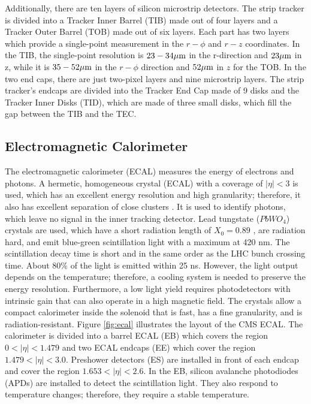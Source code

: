 Additionally, there are ten layers of silicon microstrip detectors. The strip tracker is divided into a Tracker Inner Barrel (TIB) made out of four layers and a Tracker Outer Barrel (TOB) made out of six layers. Each part has two layers which provide a single-point measurement in the $r - \phi$ and $r - z$ coordinates. In the TIB, the single-point resolution is $23 - 34 \mu \text{m}$ in the r-direction and $23 \mu \text{m}$ in z, while it is $35 - 52 \mu \text{m}$ in the $r-\phi$ direction and $52 \mu \text{m}$ in $z$ for the TOB. In the two end caps, there are just two-pixel layers and nine microstrip layers. The strip tracker's endcaps are divided into the Tracker End Cap made of 9 disks and the Tracker Inner Disks (TID), which are made of three small disks, which fill the gap between the TIB and the TEC.

\subsection{Electromagnetic Calorimeter}

The electromagnetic calorimeter (ECAL) measures the energy of electrons and photons. A hermetic, homogeneous crystal (ECAL) with a coverage of $|\eta| < 3$ is used, which has an excellent energy resolution and high granularity; therefore, it also has excellent separation of close clusters \cite{CMS:2010bta, Khachatryan:2015hwa}. It is used to identify photons, which leave no signal in the inner tracking detector. Lead tungstate ($PbWO_4$) crystals are used, which have a short radiation length of $X_0 = 0.89$ \cm, are radiation hard, and emit blue-green scintillation light with a maximum at 420 nm. The scintillation decay time is short and in the same order as the LHC bunch crossing time. About 80\% of the light is emitted within 25 ns. However, the light output depends on the temperature; therefore, a cooling system is needed to preserve the energy resolution. Furthermore, a low light yield requires photodetectors with intrinsic gain that can also operate in a high magnetic field. The crystals allow a compact calorimeter inside the solenoid that is fast, has a fine granularity, and is radiation-resistant. Figure \ref{fig:ecal} illustrates the layout of the CMS ECAL. The calorimeter is divided into a barrel ECAL (EB) which covers the region $0 < |\eta| < 1.479$ and two ECAL endcaps (EE) which cover the region $1.479 < |\eta| < 3.0$. Preshower detectors (ES) are installed in front of each endcap and cover the region $1.653 < |\eta| < 2.6$. In the EB, silicon avalanche photodiodes (APDs) are installed to detect the scintillation light. They also respond to temperature changes; therefore, they require a stable temperature.

